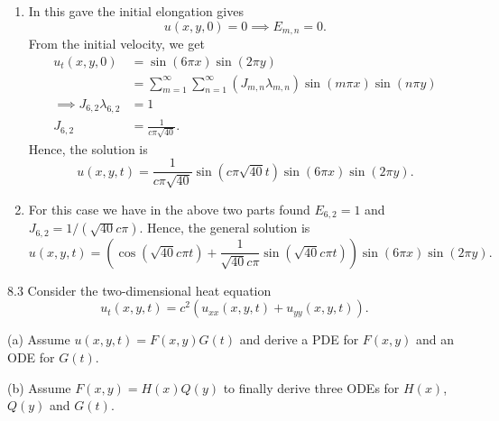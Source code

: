 \begin{derivation}
\begin{enumerate}[label=\alph*)]
    \item In this gave the initial elongation gives
      \begin{equation*}
        u(x,y,0) = 0 \implies E_{m,n} = 0
      .\end{equation*}
      From the initial velocity, we get
      \begin{align*}
        u_t(x,y,0) &= \sin (6 \pi x) \sin (2 \pi y) \\
        &= \sum_{m = 1}^{\infty} \sum_{n = 1}^{\infty} \left( J_{m,n} \lambda_{m,n} \right) \sin (m  \pi x) \sin (n \pi y) \\
        \implies J_{6,2}\lambda_{6,2} &= 1 \\
        J_{6,2} &= \frac{1}{c\pi \sqrt{40}}
      .\end{align*}
      Hence, the solution is
      \begin{equation*}
        u(x,y,t) = \frac{1}{c \pi \sqrt{40}} \sin \left( c \pi \sqrt{40}t \right) \sin (6 \pi x) \sin (2 \pi y)
      .\end{equation*}
      
    \item For this case we have in the above two parts found $E_{6,2} = 1$ and $J_{6,2} = 1 / (\sqrt{40} c \pi)$.
      Hence, the general solution is
      \begin{equation*}
        u(x,y,t) = \left( \cos (\sqrt{40}c\pi t) + \frac{1}{\sqrt{40}c\pi} \sin (\sqrt{40}c \pi t)  \right) \sin(6\pi x) \sin (2\pi y)
      .\end{equation*}
  \end{enumerate}
\end{derivation}


\begin{problem}{8.3}
  Consider the two-dimensional heat equation
  \[ 
  u_t(x,y,t) = c^2 (u_{x x}(x,y,t) + u_{yy}(x,y,t))
  .\]
  
  (a) Assume $u(x,y,t) = F(x,y)G(t)$ and derive a PDE for $F(x,y)$ and an ODE for $G(t)$.

  (b) Assume $F(x,y) = H(x) Q(y)$ to finally derive three ODEs for $H(x)$, $Q(y)$ and $G(t)$.
\end{problem}

